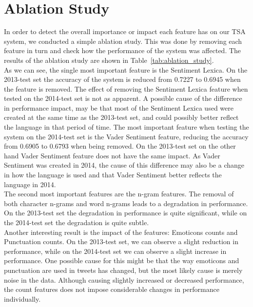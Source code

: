 \section{Ablation Study}
\label{sec:ablation_study}
In order to detect the overall importance or impact each feature has on our TSA system, we conducted a simple ablation study. This was done by removing each feature in turn and check how the performance of the system was affected. The results of the ablation study are shown in Table~\ref{tab:ablation_study}. \\

As we can see, the single most important feature is the  Sentiment Lexica. On the 2013-test set the accuracy of the system is reduced from 0.7227 to 0.6945 when the feature is removed. The effect of removing the Sentiment Lexica feature when tested on the 2014-test set is not as apparent. A possible cause of the difference in performance impact, may be that most of the Sentiment Lexica used were created at the same time as the 2013-test set, and could possibly better reflect the language in that period of time. The most important feature when testing the system on the 2014-test set is the Vader Sentiment feature, reducing the accuracy from 0.6905 to 0.6793 when being removed. On the 2013-test set on the other hand Vader Sentiment feature does not have the same impact. As Vader Sentiment was created in 2014, the cause of this difference may also be a change in how the language is used and that Vader Sentiment better reflects the language in 2014.  \\

The second most important features are the n-gram features. The removal of both character n-grams and word n-grams leads to a degradation in performance. On the 2013-test set the degradation in performance is quite significant, while on the 2014-test set the degradation is quite subtle. \\

Another interesting result is the impact of the features: Emoticons counts and Punctuation counts. On the 2013-test set, we can observe a slight reduction in performance, while on the 2014-test set we can observe a slight increase in performance. One possible cause for this might be that the way emoticons and punctuation are used in tweets has changed, but the most likely cause is merely noise in the data. Although causing slightly increased or decreased performance, the count features does not impose considerable changes in performance individually.


